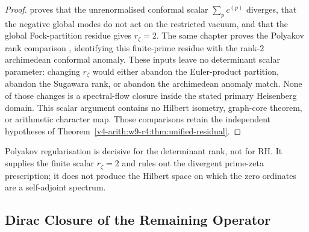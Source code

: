 \begin{proof}
 proves that the unrenormalised conformal scalar
\(\sum_{p}c^{(p)}\) diverges, that the negative global modes do not act
on the restricted vacuum, and that the global Fock-partition residue
gives \(r_{\zeta}=2\). The same chapter proves the Polyakov
rank comparison
, identifying this
finite-prime residue with the rank-\(2\) archimedean conformal
anomaly. These inputs leave no determinant scalar parameter: changing
\(r_{\zeta}\) would either abandon the Euler-product
partition, abandon the Sugawara rank, or abandon the archimedean
anomaly match. None of those changes is a spectral-flow closure
inside the stated primary Heisenberg domain. This scalar argument
contains no Hilbert isometry, graph-core theorem, or arithmetic
character map. Those comparisons retain the independent hypotheses
of Theorem~\ref{v4-arith:w9-r4:thm:unified-residual}.
\end{proof}

\begin{remark}
\label{v4-arith:w9-r4:rem:polyakov-no-rh}
Polyakov regularisation is decisive for the determinant rank,
not for RH. It supplies the finite scalar \(r_{\zeta}=2\) and
rules out the divergent prime-zeta prescription; it does not
produce the Hilbert space on which the zero ordinates are a
self-adjoint spectrum.
\end{remark}

\subsection{Dirac Closure of the Remaining Operator}
\label{v4-arith:w9-r4:pdnf:dirac}

